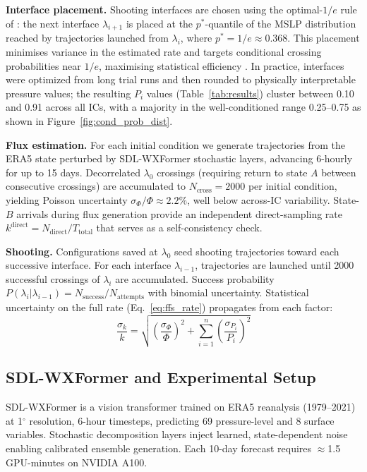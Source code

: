 \documentclass[11pt]{article}
\begin{document}
\textbf{Interface placement.}
Shooting interfaces are chosen using the optimal-$1/e$ rule of
\citet{allen2009forward}: the next interface $\lambda_{i+1}$ is placed at the
$p^*$-quantile of the MSLP distribution reached by trajectories launched from
$\lambda_i$, where $p^* = 1/e \approx 0.368$.  This placement minimises variance in
the estimated rate and targets conditional crossing probabilities near $1/e$,
maximising statistical efficiency \citep{allen2009forward}.
In practice, interfaces were optimized from long trial runs and then rounded to
physically interpretable pressure values; the resulting $P_i$ values (Table~\ref{tab:results})
cluster between 0.10 and 0.91 across all ICs, with a majority in the well-conditioned
range 0.25--0.75 as shown in Figure~\ref{fig:cond_prob_dist}.

\textbf{Flux estimation.}
For each initial condition we generate trajectories from the ERA5 state perturbed by
SDL-WXFormer stochastic layers, advancing 6-hourly for up to 15 days. Decorrelated
$\lambda_0$ crossings (requiring return to state $A$ between consecutive crossings) are
accumulated to $N_{\text{cross}} = 2000$ per initial condition, yielding Poisson
uncertainty $\sigma_\Phi/\Phi \approx 2.2\%$, well below across-IC variability.
State-$B$ arrivals during flux generation provide an independent direct-sampling rate
$k^{\text{direct}} = N_{\text{direct}}/T_{\text{total}}$ that serves as a self-consistency check.

\textbf{Shooting.}
Configurations saved at $\lambda_0$ seed shooting trajectories toward each successive
interface. For each interface $\lambda_{i-1}$, trajectories are launched until 2000
successful crossings of $\lambda_i$ are accumulated. Success probability
$P(\lambda_i|\lambda_{i-1}) = N_{\text{success}}/N_{\text{attempts}}$ with binomial
uncertainty. Statistical uncertainty on the full rate (Eq.~\ref{eq:ffs_rate}) propagates
from each factor:
\begin{equation}
\frac{\sigma_k}{k} = \sqrt{\left(\frac{\sigma_\Phi}{\Phi}\right)^2 + \sum_{i=1}^{n}\left(\frac{\sigma_{P_i}}{P_i}\right)^2}
\end{equation}

\subsection{SDL-WXFormer and Experimental Setup}

SDL-WXFormer \citep{schreck2025sdl} is a vision transformer trained on ERA5 reanalysis
(1979--2021) at 1$^\circ$ resolution, 6-hour timesteps, predicting 69 pressure-level
and 8 surface variables. Stochastic decomposition layers inject learned, state-dependent
noise enabling calibrated ensemble generation. Each 10-day forecast requires
$\approx$1.5 GPU-minutes on NVIDIA A100.
\end{document}
